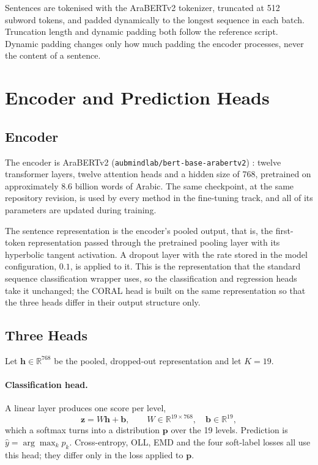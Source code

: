 Sentences are tokenised with the AraBERTv2 tokenizer, truncated at 512 subword tokens, and
padded dynamically to the longest sequence in each batch. Truncation length and dynamic padding
both follow the reference script. Dynamic padding changes only how much padding the encoder
processes, never the content of a sentence.

\section{Encoder and Prediction Heads}
\label{sec:meth-heads}

\subsection{Encoder}

The encoder is AraBERTv2 (\texttt{aubmindlab/bert-base-arabertv2})
\cite{antoun2020arabert}: twelve transformer layers, twelve attention heads and a hidden size
of 768, pretrained on approximately 8.6 billion words of Arabic. The same checkpoint, at the
same repository revision, is used by every method in the fine-tuning track, and all of its
parameters are updated during training.

The sentence representation is the encoder's pooled output, that is, the first-token
representation passed through the pretrained pooling layer with its hyperbolic tangent
activation. A dropout layer with the rate stored in the model configuration, $0.1$, is applied
to it. This is the representation that the standard sequence classification wrapper uses, so
the classification and regression heads take it unchanged; the CORAL head is built on the same
representation so that the three heads differ in their output structure only.

\subsection{Three Heads}

Let $\mathbf{h} \in \mathbb{R}^{768}$ be the pooled, dropped-out representation and let $K=19$.

\paragraph{Classification head.} A linear layer produces one score per level,
\begin{equation}
\mathbf{z} = W\mathbf{h} + \mathbf{b}, \qquad W \in \mathbb{R}^{19\times768},\quad
\mathbf{b}\in\mathbb{R}^{19},
\end{equation}
which a softmax turns into a distribution $\mathbf{p}$ over the 19 levels. Prediction is
$\hat{y} = \arg\max_k p_k$. Cross-entropy, OLL, EMD and the four soft-label losses all use this
head; they differ only in the loss applied to $\mathbf{p}$.

